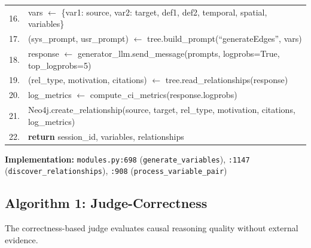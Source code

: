 \begin{table}[H]
\begin{tabular}{@{}r l@{}}
16. & \quad vars $\leftarrow$ \{var1: source, var2: target, def1, def2, temporal, spatial, variables\} \\
17. & \quad (sys\_prompt, usr\_prompt) $\leftarrow$ tree.build\_prompt(``generateEdges'', vars) \\
18. & \quad response $\leftarrow$ generator\_llm.send\_message(prompts, logprobs=True, top\_logprobs=5) \\
19. & \quad (rel\_type, motivation, citations) $\leftarrow$ tree.read\_relationships(response) \\
20. & \quad log\_metrics $\leftarrow$ compute\_ci\_metrics(response.logprobs) \\
21. & \quad Neo4j.create\_relationship(source, target, rel\_type, motivation, citations, log\_metrics) \\
22. & \textbf{return} session\_id, variables, relationships \\
\bottomrule
\end{tabular}
\end{table}

\textbf{Implementation:} \texttt{modules.py:698} (\texttt{generate\_variables}), \texttt{:1147} (\texttt{discover\_relationships}), \texttt{:908} (\texttt{process\_variable\_pair})

\subsection{Algorithm 1: Judge-Correctness}
\label{alg:judge_correctness}

The correctness-based judge evaluates causal reasoning quality without external evidence.

